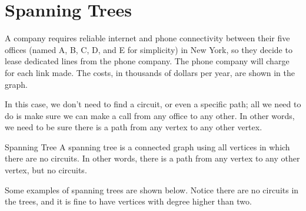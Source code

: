 \section{Spanning Trees}
A company requires reliable internet and phone connectivity between their five offices (named A, B, C, D, and E for simplicity) in New York, so they decide to lease dedicated lines from the phone company.  The phone company will charge for each link made.  The costs, in thousands of dollars per year, are shown in the graph.

\begin{center}
\end{center}

In this case, we don't need to find a circuit, or even a specific path; all we need to do is make sure we can make a call from any office to any other.  In other words, we need to be sure there is a path from any vertex to any other vertex.


\begin{definition}{Spanning Tree}{}
A spanning tree is a connected graph using all vertices in which there are no circuits.  
In other words, there is a path from any vertex to any other vertex, but no circuits.   
\end{definition}

Some examples of spanning trees are shown below.  Notice there are no circuits in the trees, and it is fine to have vertices with degree higher than two.\\


